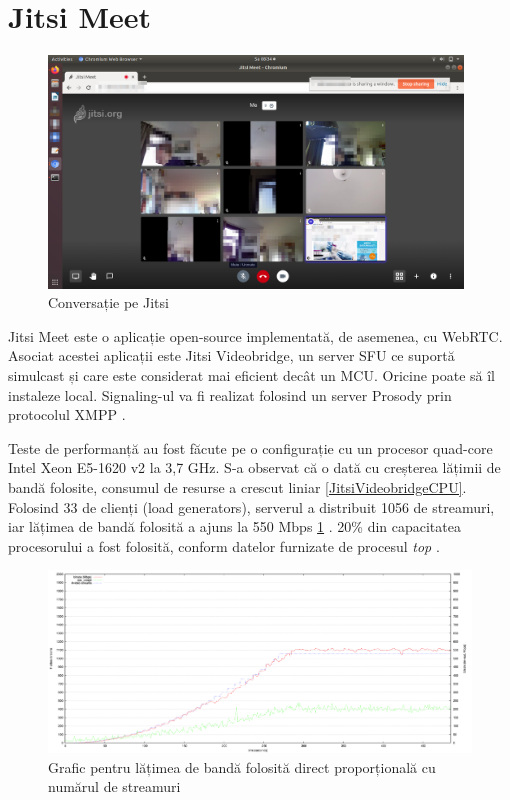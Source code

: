 \section{Jitsi Meet}
\label{chap:ch4sec2}
\begin{figure}[!htbp]
    \centering
    \includegraphics[width=11cm]{figures/jitsi_meet_call.png}
    \caption{Conversație pe Jitsi}
\end{figure}
\indent \par Jitsi Meet este o aplicație open-source implementată, de asemenea, cu WebRTC. Asociat acestei aplicații este Jitsi Videobridge, un server SFU ce suportă simulcast și care este considerat mai eficient decât un MCU. Oricine poate să îl instaleze local. Signaling-ul va fi realizat folosind un server Prosody prin protocolul XMPP \cite{JitsiArchitecture}.
\indent \par Teste de performanță au fost făcute pe o configurație cu un procesor quad-core Intel Xeon E5-1620 v2 la 3,7 GHz. S-a observat că o dată cu creșterea lățimii de bandă folosite, consumul de resurse a crescut liniar \ref{JitsiVideobridgeCPU}.  Folosind 33 de clienți (load generators), serverul a distribuit 1056 de streamuri, iar lățimea de bandă folosită a ajuns la 550 Mbps \ref{JitsiVideobridgeBandwidth} \cite{JitsiVideobridge}. 20\% din capacitatea procesorului a fost folosită, conform datelor furnizate de procesul \textit{top} \cite{JitsiVideobridge}.
\begin{figure}[H]
    \centering
    \includegraphics[width=15cm]{figures/jitsi_videobridge_bandwidth.png}
    \caption{Grafic pentru lățimea de bandă folosită direct proporțională cu numărul de streamuri \cite{JitsiVideobridge}}
    \label{JitsiVideobridgeBandwidth}
\end{figure}
